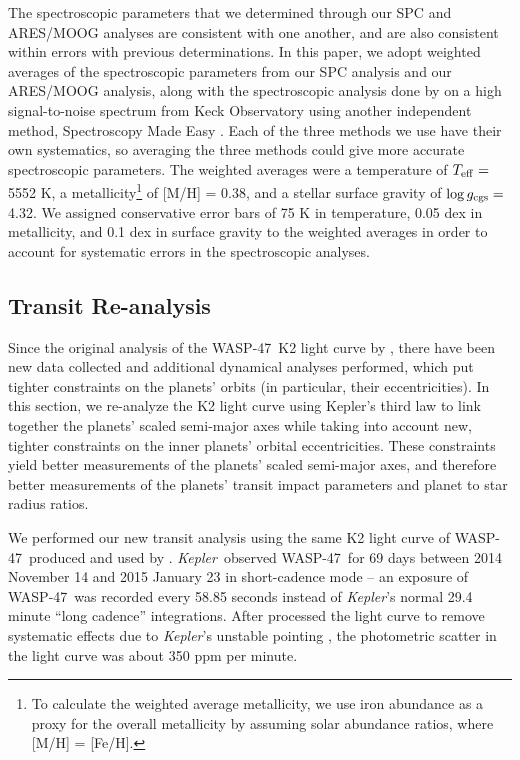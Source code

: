 \documentclass{emulateapj}
\newcommand{\Kepler}{{\it Kepler}}
\newcommand{\ron}{\color{black}}
\newcommand{\thisstar}{WASP-47}
\begin{document}
The spectroscopic parameters that we determined through our SPC and ARES/MOOG analyses are consistent with one another, and are also consistent within errors with previous determinations. In this paper, we adopt weighted averages of the spectroscopic parameters from our SPC analysis and our ARES/MOOG analysis, along with the spectroscopic analysis done  by \citet{sinukoffw47} on a high signal-to-noise spectrum from Keck Observatory using another independent method, Spectroscopy Made Easy \citep[SME, ][]{brewer2015, brewer2016}. Each of the three methods we use have their own systematics, so averaging the three methods could give more accurate spectroscopic parameters. The weighted averages were a temperature of $T_{\rm eff} =$ 5552 K, a metallicity\footnote{To calculate the weighted average metallicity, we use iron abundance as a proxy for the overall metallicity {\ron by assuming solar abundance ratios, where [M/H] = [Fe/H].}} of [M/H] = 0.38, and a stellar surface gravity of $\log{g_{\rm cgs}} =$ 4.32. We assigned conservative error bars of 75 K in temperature, 0.05 dex in metallicity, and 0.1 dex in surface gravity to the weighted averages in order to account for systematic errors in the spectroscopic analyses.



\subsection{Transit Re-analysis}
\label{sec:lc_analysis}

Since the original analysis of the \thisstar\ K2 light curve by \citet{becker}, there have been new data collected \citep{sinukoffw47} and additional dynamical analyses \citep{almenara, weissw47} performed, which put tighter constraints on the planets' orbits (in particular, their eccentricities). In this section, we re-analyze the K2 light curve using Kepler's third law to link together the planets' scaled semi-major axes while taking into account new, tighter constraints on the inner planets' orbital eccentricities. These constraints yield better measurements of the planets' scaled semi-major axes, and therefore better measurements of the planets' transit impact parameters and planet to star radius ratios. 

We performed our new transit analysis using the same K2 light curve of \thisstar\ produced and used by \citet{becker}.  \Kepler\ observed \thisstar\ for 69 days between 2014 November 14 and 2015 January 23 in short-cadence mode -- an exposure of \thisstar\ was recorded every 58.85 seconds instead of \Kepler's normal 29.4 minute ``long cadence'' integrations. After \citet{becker} processed the light curve to remove systematic effects due to \Kepler's unstable pointing \citep[see also ][]{vj14,v15},  the photometric scatter in the light curve was about 350 ppm per minute. 
\end{document}
